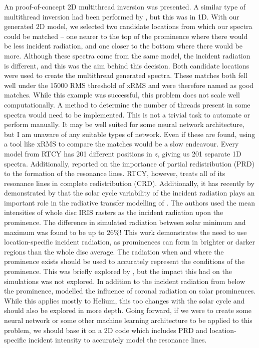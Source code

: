 An proof-of-concept 2D multithread inversion was presented. A similar type of multithread inversion had been performed by \cite{heinzel_understanding_2015}, but this was in 1D. With our generated 2D model, we selected two candidate locations from which our spectra could be matched -- one nearer to the top of the prominence where there would be less incident radiation, and one closer to the bottom where there would be more. Although these spectra come from the same model, the incident radiation is different, and this was the aim behind this decision. Both candidate locations were used to create the multithread generated spectra. These matches both fell well under the 15000 RMS threshold of xRMS and were therefore named as good matches. While this example was successful, this problem does not scale well computationally. A method to determine the number of threads present in some spectra would need to be implemented. This is not a trivial task to automate or perform manually. It may be well suited for some neural network architecture, but I am unaware of any suitable types of network. Even if these are found, using a tool like xRMS to compare the matches would be a slow endeavour. Every model from RTCY has 201 different positions in $z$, giving us 201 separate 1D spectra. Additionally, \cite{heinzel_formation_2014} reported on the importance of partial redistribution (PRD) to the formation of the \mgiihk{} resonance lines. RTCY, however, treats all of its resonance lines in complete redistribution (CRD). Additionally, it has recently by demonstrated by \cite{gunar_large_2022} that the solar cycle variability of the incident radiation plays an important role in the radiative transfer modelling of \mgiihk{}. The authors used the mean intensities of whole disc IRIS rasters as the incident radiation upon the prominence. The difference in simulated radiation between solar minimum and maximum was found to be up to 26\%! This work demonstrates the need to use location-specific incident radiation, as prominences can form in brighter or darker regions than the whole disc average. The radiation when and where the prominence exists should be used to accurately represent the conditions of the prominence. This was briefly explored by \cite{zhang_launch_2019}, but the impact this had on the simulations was not explored. In addition to the incident radiation from below the prominence, \cite{brown_influence_2018} modelled the influence of coronal radiation on solar prominences. While this applies mostly to Helium, this too changes with the solar cycle and should also be explored in more depth. Going forward, if we were to create some neural network or some other machine learning architecture to be applied to this problem, we should base it on a 2D code which includes PRD and location-specific incident intensity to accurately model the \mgiihk{} resonance lines. 

